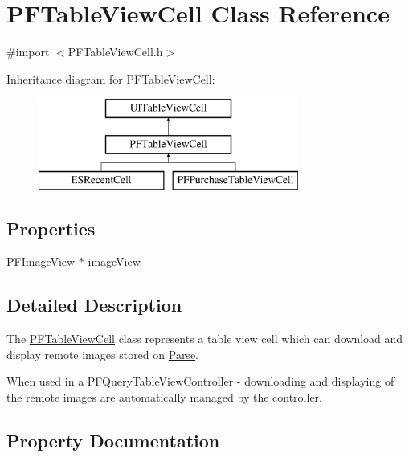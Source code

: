 \hypertarget{interface_p_f_table_view_cell}{}\section{P\+F\+Table\+View\+Cell Class Reference}
\label{interface_p_f_table_view_cell}


{\ttfamily \#import $<$P\+F\+Table\+View\+Cell.\+h$>$}

Inheritance diagram for P\+F\+Table\+View\+Cell\+:\begin{figure}[H]
\begin{center}
\leavevmode
\includegraphics[height=3.000000cm]{interface_p_f_table_view_cell}
\end{center}
\end{figure}
\subsection*{Properties}
\begin{DoxyCompactItemize}
\item 
P\+F\+Image\+View $\ast$ \hyperlink{interface_p_f_table_view_cell_a7a0539734c5a2d002fba791497adbfa2}{image\+View}
\end{DoxyCompactItemize}


\subsection{Detailed Description}
The {\ttfamily \hyperlink{interface_p_f_table_view_cell}{P\+F\+Table\+View\+Cell}} class represents a table view cell which can download and display remote images stored on \hyperlink{interface_parse}{Parse}.

When used in a {\ttfamily P\+F\+Query\+Table\+View\+Controller} -\/ downloading and displaying of the remote images are automatically managed by the controller. 

\subsection{Property Documentation}
\hypertarget{interface_p_f_table_view_cell_a7a0539734c5a2d002fba791497adbfa2}{}
